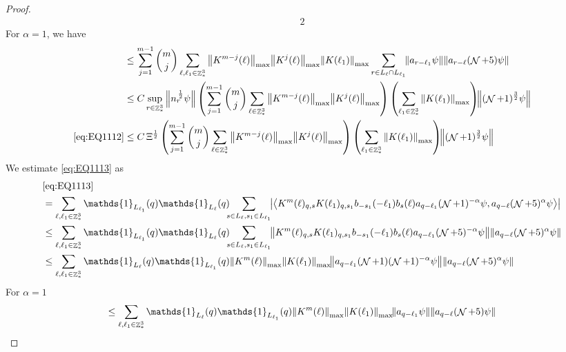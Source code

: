 \documentclass[sn-mathphys, Numbered ,a4paper]{sn-jnl}%
\DeclareMathOperator{\Z}{\mathbb{Z}}
\DeclareMathOperator{\NN}{\mathcal{N}}
\newcommand{\half}{\frac{1}{2}}
\newcommand{\eva}[1]{\left\langle #1 \right\rangle}
\theoremstyle{plain}
\theoremstyle{definition}
\theoremstyle{remark}
\theoremstyle{plain}
\theoremstyle{definition}
\theoremstyle{remark}
\begin{document}
\begin{proof}
\begin{alignat}{2}
\end{alignat} 
For $\alpha = 1$, we have
\begin{align}
	&\leq \sum\limits_{j=1}^{m-1} {{m}\choose j} \sum\limits_{\ell, \ell_1\in \Z^3_*} \norm{K^{m-j}(\ell)}_{\mathrm{max}} \norm{ K^{j}(\ell)}_{\mathrm{max}} \norm{ K(\ell_1) }_{\mathrm{max}} \sum\limits_{r\in L_{\ell} \cap L_{\ell_1}}\!\! \norm{ a_{r-\ell_1} \psi} \norm{ a_{r-\ell}(\NN+5) \psi }\nonumber\\
	&\leq C \sup\limits_{r \in \Z^3_*} \norm{ n^{\,\half}_r \psi} \left(  \sum\limits_{j=1}^{m-1} {{m}\choose j} \sum\limits_{\ell \in \Z^3_*} \norm{K^{m-j}(\ell)}_{\mathrm{max}} \norm{ K^{j}(\ell)}_{\mathrm{max}} \right) \left( \sum\limits_{ \ell_1\in \Z^3_*} \norm{ K(\ell_1) }_{\mathrm{max} } \right)\!\! \norm{(\NN+1)^{\frac{3}{2}} \psi }\nonumber\\
	\eqref{eq:EQ1112}&\leq C \, \Xi^\half \left(  \sum\limits_{j=1}^{m-1} {{m}\choose j} \sum\limits_{\ell \in \Z^3_*} \norm{K^{m-j}(\ell)}_{\mathrm{max}} \norm{ K^{j}(\ell)}_{\mathrm{max}}\right) \left( \sum\limits_{ \ell_1\in \Z^3_*}\norm{ K(\ell_1) }_{\mathrm{max}} \right)\!\! \norm{(\NN+1)^{\frac{3}{2}} \psi }\label{eq:estEQ1112}		
\end{align}
We estimate \eqref{eq:EQ1113} as
\begin{align}
	&\eqref{eq:EQ1113}\nonumber\\
	&=\sum\limits_{\ell, \ell_1\in \Z^3_*} \mathds{1}_{L_{\ell_1}}(q) \mathds{1}_{L_{\ell}}(q) \!\!\! \sum\limits_{s \in L_{\ell},s_1\in L_{\ell_1}}\!\! \abs{\eva{ K^m(\ell)_{q,s}K(\ell_1)_{q,s_1} b_{-s_1}(-\ell_1) b_{s}(\ell) a_{q-\ell_1} (\NN+1)^{-\alpha}\psi, a_{q-\ell} (\NN+5)^{\alpha} \psi }}\nonumber\\
	&\leq\sum\limits_{\ell, \ell_1\in \Z^3_*} \mathds{1}_{L_{\ell_1}}(q) \mathds{1}_{L_{\ell}}(q) \!\!\! \sum\limits_{s \in L_{\ell},s_1\in L_{\ell_1}}\!\!  \norm{ K^m(\ell)_{q,s}K(\ell_1)_{q,s_1} b_{-s_1}(-\ell_1) b_{s}(\ell) a_{q-\ell_1} (\NN+5)^{-\alpha}\psi}\norm{ a_{q-\ell} (\NN+5)^{\alpha} \psi }\nonumber\\
	&\leq\sum\limits_{\ell, \ell_1\in \Z^3_*} \mathds{1}_{L_{\ell}}(q) \mathds{1}_{L_{\ell_1}}(q) \norm{K^m(\ell)}_{\mathrm{max}} \norm{ K(\ell_1)}_{\mathrm{max}} \!  \norm{ a_{q-\ell_1} (\NN+1) (\NN+1)^{-\alpha} \psi} \norm{ a_{q-\ell} (\NN+5)^{\alpha} \psi }\nonumber
\end{align}
For $\alpha=1$
\begin{equation}
	\leq\sum\limits_{\ell, \ell_1\in \Z^3_*} \mathds{1}_{L_{\ell}}(q)  \mathds{1}_{L_{\ell_1}}(q)\norm{K^m(\ell)}_{\mathrm{max}} \norm{ K(\ell_1)}_{\mathrm{max}} \! \norm{ a_{q-\ell_1} \psi} \norm{ a_{q-\ell} (\NN+5) \psi }\nonumber

\end{equation}
\end{proof}
\end{document}
